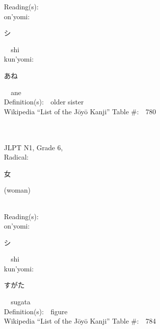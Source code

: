 \begin{multicols}{2}
Reading(s):\ \ \\
{\hspace*{1em}}on'yomi:\ \ \\
{\hspace*{2em}}{\begin{CJK}{UTF8}{min} シ \end{CJK}}\ \ shi\ \ \\
{\hspace*{1em}}kun'yomi:\ \ \\
{\hspace*{2em}}{\begin{CJK}{UTF8}{min} あね \end{CJK}}\ \ ane\ \ \\
Definition(s):\ \ older sister \\
Wikipedia ``List of the J\=oy\=o Kanji'' Table \#:\ \ 780 \\
\ \ \\
{\fontsize{34pt}{40pt}  }\ \ \\  %
{JLPT N1, Grade 6, \\Radical:\ \ {\begin{CJK}{UTF8}{min} 女 \end{CJK}} (woman) } \\
Reading(s):\ \ \\
{\hspace*{1em}}on'yomi:\ \ \\
{\hspace*{2em}}{\begin{CJK}{UTF8}{min} シ \end{CJK}}\ \ shi\ \ \\
{\hspace*{1em}}kun'yomi:\ \ \\
{\hspace*{2em}}{\begin{CJK}{UTF8}{min} すがた \end{CJK}}\ \ sugata\ \ \\
Definition(s):\ \ figure \\
Wikipedia ``List of the J\=oy\=o Kanji'' Table \#:\ \ 784 \\
\ \ \\
{\fontsize{34pt}{40pt}  }\ \ \\  %

\end{multicols}
